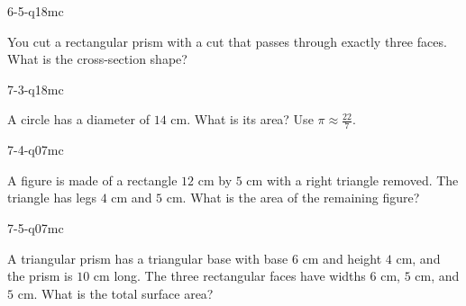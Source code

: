 \begin{practiceQuestion}{6-5-q18}{mc}
\begin{questionText}
You cut a rectangular prism with a cut that passes through exactly three faces. What is the cross-section shape?
\end{questionText}
\end{practiceQuestion}

\begin{practiceQuestion}{7-3-q18}{mc}
\begin{questionText}
A circle has a diameter of $14$ cm. What is its area? Use $\pi \approx \frac{22}{7}$.
\end{questionText}
\end{practiceQuestion}

\begin{practiceQuestion}{7-4-q07}{mc}
\begin{questionText}
A figure is made of a rectangle $12$ cm by $5$ cm with a right triangle removed. The triangle has legs $4$ cm and $5$ cm. What is the area of the remaining figure?
\end{questionText}
\end{practiceQuestion}

\begin{practiceQuestion}{7-5-q07}{mc}
\begin{questionText}
A triangular prism has a triangular base with base $6$ cm and height $4$ cm, and the prism is $10$ cm long. The three rectangular faces have widths $6$ cm, $5$ cm, and $5$ cm. What is the total surface area?
\end{questionText}
\end{practiceQuestion}

